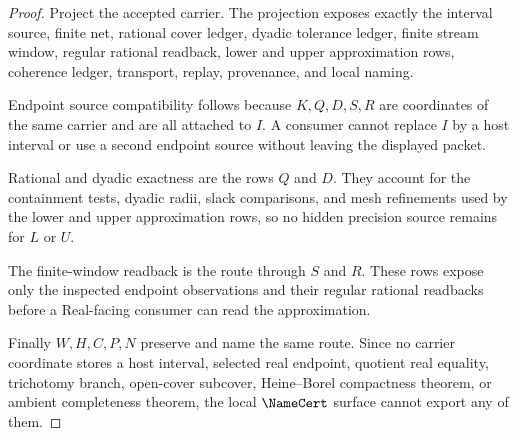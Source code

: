 \begin{proof}
Project the accepted carrier. The projection exposes exactly the interval source, finite net, rational cover ledger, dyadic tolerance ledger, finite stream window, regular rational readback, lower and upper approximation rows, coherence ledger, transport, replay, provenance, and local naming.

Endpoint source compatibility follows because $K,Q,D,S,R$ are coordinates of the same carrier and are all attached to $I$. A consumer cannot replace $I$ by a host interval or use a second endpoint source without leaving the displayed packet.

Rational and dyadic exactness are the rows $Q$ and $D$. They account for the containment tests, dyadic radii, slack comparisons, and mesh refinements used by the lower and upper approximation rows, so no hidden precision source remains for $L$ or $U$.

The finite-window readback is the route through $S$ and $R$. These rows expose only the inspected endpoint observations and their regular rational readbacks before a Real-facing consumer can read the approximation.

Finally $W,H,C,P,N$ preserve and name the same route. Since no carrier coordinate stores a host interval, selected real endpoint, quotient real equality, trichotomy branch, open-cover subcover, Heine--Borel compactness theorem, or ambient completeness theorem, the local $\NameCert$ surface cannot export any of them.
\end{proof}


